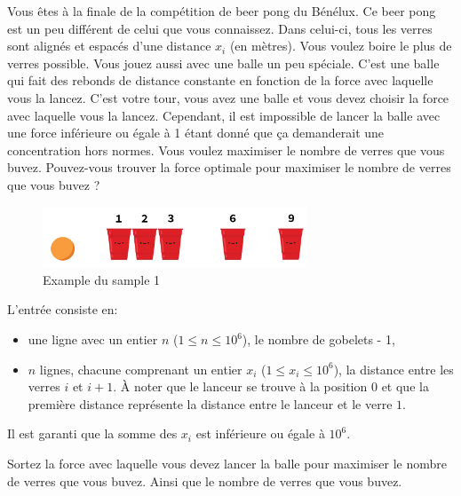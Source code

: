 \problemname{\problemyamlname}


\newcommand{\maxn}{10^{6}}

Vous êtes à la finale de la compétition de beer pong du Bénélux. Ce beer pong est un peu différent de celui que vous connaissez. Dans celui-ci, tous les verres sont alignés et espacés d'une distance $x_i$ (en mètres). Vous voulez boire le plus de verres possible. Vous jouez aussi avec une balle un peu spéciale. C'est une balle qui fait des rebonds de distance constante en fonction de la force avec laquelle vous la lancez.
C'est votre tour, vous avez une balle et vous devez choisir la force avec laquelle vous la lancez. Cependant, il est impossible de lancer la balle avec une force inférieure ou égale à 1 étant donné que ça demanderait une concentration hors normes. Vous voulez maximiser le nombre de verres que vous buvez. Pouvez-vous trouver la force optimale pour maximiser le nombre de verres que vous buvez ?
\smallskip
\begin{figure}[h]
    \centering
    \includegraphics[width=0.7\textwidth]{illustration.png}
    \caption{Example du sample 1}
\end{figure}

\begin{Input}
    L'entrée consiste en:
    \begin{itemize}
        \item une ligne avec un entier  $n$ ($1\leq n\leq \maxn$), le nombre de gobelets - 1,
        \item $n$ lignes, chacune comprenant un entier $x_i$ ($1\leq x_i\leq \maxn$), la distance entre les verres $i$ et $i+1$. À noter que le lanceur se trouve à la position $0$ et que la première distance représente la distance entre le lanceur et le verre $1$.
    \end{itemize}
    Il est garanti que la somme des $x_i$ est inférieure ou égale à $\maxn$.
\end{Input}

\begin{Output}
    Sortez la force avec laquelle vous devez lancer la balle pour maximiser le nombre de verres que vous buvez. Ainsi que le nombre de verres que vous buvez.
\end{Output}

